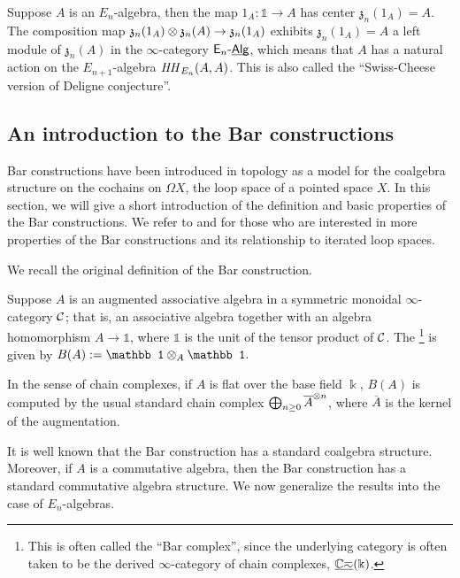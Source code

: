 \documentclass[twoside]{article}
\begin{document}
\begin{example}
    Suppose $A$ is an $E_n$-algebra, then the map $1_A:\mathbb1\to A$ has center
    $\mathfrak z_n(1_A)=A$. The composition map $\mathfrak z_n(1_A)\otimes
    \mathfrak z_n(A)\to\mathfrak z_n(1_A)$ exhibits $\mathfrak z_n(1_A)=A$
    a left module of $\mathfrak z_n(A)$ in the $\infty$-category $\mathsf{E}_n\text{-}\underline{\smash{\mathsf{Alg}}}$,
    which means that $A$ has a natural action on the $E_{n+1}$-algebra 
    $\mathit{HH}_{E_n}(A,A)$. This is also called the ``Swiss-Cheese version of
    Deligne conjecture''.
\end{example}

\subsection{An introduction to the Bar constructions}

Bar constructions have been introduced in topology as a model for the 
coalgebra structure on the cochains on $\Omega X$, the loop space of a pointed
space $X$. In this section, we will give a short introduction of the definition
and basic properties of the Bar constructions. We refer to \cite{Fra11} and
\cite{GTZ12} for those who are interested in more properties of the
Bar constructions and its relationship to iterated loop spaces.

We recall the original definition of the Bar construction.

\begin{definition}
    Suppose $A$ is an augmented associative algebra in a symmetric monoidal $\infty$-category
    $\cal C$; that is, an associative algebra
    together with an algebra homomorphism $A\to\mathbb1$, where $\mathbb1$ is the 
    unit of the tensor product of $\cal C$. The 
    \footnote{This is often called the ``Bar complex'', since
    the underlying category is often taken to be the derived $\infty$-category
    of chain complexes, $\underline{\mathbb{Ch}}(\Bbbk)$.} is given by $B(A):=\mathbb1\ox_A\mathbb1.$
\end{definition}

\begin{remark}
    In the sense of chain complexes, if $A$ is flat over the base field
    $\Bbbk$, $B(A)$ is computed by the usual standard chain complex 
    $\bigoplus_{n\ge 0}\overline{A}^{\otimes n}$, where $\overline A$ is the kernel
    of the augmentation.
\end{remark}

It is well known that the Bar construction has a standard coalgebra structure.
Moreover, if $A$ is a commutative algebra, then the Bar construction has a
standard commutative algebra structure. We now generalize the results into the case of
$E_n$-algebras.
\end{document}
